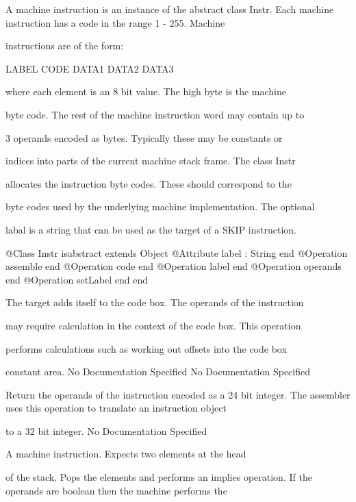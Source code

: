       A machine instruction is an instance of the abstract class Instr.
      Each machine instruction has a code in the range 1 - 255. Machine

      instructions are of the form:

      LABEL CODE DATA1 DATA2 DATA3

      where each element is an 8 bit value. The high byte is the machine

      byte code. The rest of the machine instruction word may contain up to

      3 operands encoded as bytes. Typically these may be constants or

      indices into parts of the current machine stack frame. The class Instr

      allocates the instruction byte codes. These should correspond to the

      byte codes used by the underlying machine implementation. The optional

      labal is a string that can be used as the target of a SKIP instruction.
\begin{Interface}
@Class Instr isabstract extends Object
  @Attribute label : String end
  @Operation assemble end
  @Operation code end
  @Operation label end
  @Operation operands end
  @Operation setLabel end
end
\end{Interface}

        The target adds itself to the code box. The operands of the instruction

        may require calculation in the context of the code box. This operation

        performs calculations such as working out offsets into the code box

        constant area.
No Documentation Specified
No Documentation Specified

        Return the operands of the instruction encoded as a 24 bit integer.
        The assembler uses this operation to translate an instruction object

        to a 32 bit integer.
No Documentation Specified

      A machine instruction. Expects two elements at the head

      of the stack. Pops the elements and performs an implies operation.
      If the operands are boolean then the machine performs the

